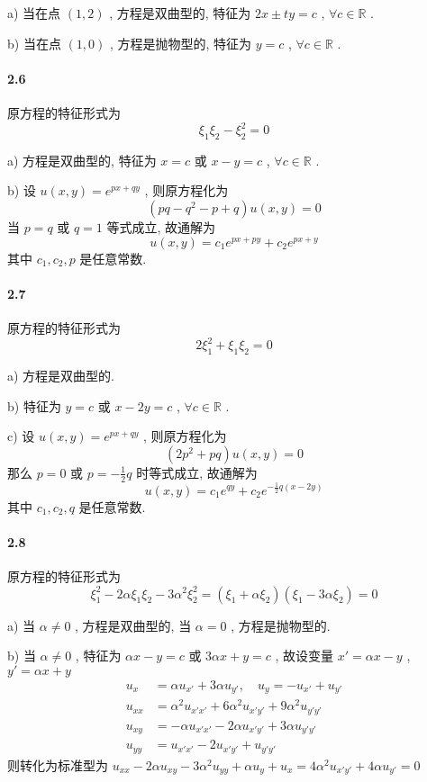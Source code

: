 \documentclass[a4paper, UTF8]{ctexart}				%
\begin{document}
        a) 当在点 $(1,2)$ , 方程是双曲型的, 特征为 $2x \pm ty = c$ , $\forall c \in \mathbb{R}$ .

        b) 当在点 $(1,0)$ , 方程是抛物型的, 特征为 $y = c$ , $\forall c \in \mathbb{R}$ .
    \paragraph{2.6}\quad 
        原方程的特征形式为 
        \[
            \xi_1\xi_2 - \xi_2^2 = 0
        \]

        a) 方程是双曲型的, 特征为 $x = c$ 或 $x - y = c$ , $\forall c \in \mathbb{R}$ .

        b) 设 $u(x,y) = e^{px+qy}$ , 则原方程化为 
        \[
            (pq-q^2-p+q)u(x,y) = 0
        \]
        当 $p=q$ 或 $q=1$ 等式成立, 故通解为 
        \[
            u(x,y) = c_1 e^{px+py} + c_2 e^{px+y}
        \]
        其中 $c_1, c_2, p$ 是任意常数.
    \paragraph{2.7}\quad 
        原方程的特征形式为 
        \[
            2\xi_1^2 + \xi_1\xi_2 = 0
        \]

        a) 方程是双曲型的.

        b) 特征为 $y = c$ 或 $x - 2y = c$ , $\forall c \in \mathbb{R}$ .

        c) 设 $u(x,y) = e^{px+qy}$ , 则原方程化为 
        \[
            (2p^2+pq)u(x,y)=0
        \]
        那么 $p=0$ 或 $p=-\frac{1}{2}q$ 时等式成立, 故通解为
        $$
            u(x,y) = c_1 e^{qy} + c_2 e^{-\frac{1}{2}q(x-2y)}
        $$
        其中 $c_1, c_2, q$ 是任意常数.
    \paragraph{2.8}\quad 
        原方程的特征形式为 
        \[
            \xi_1^2 -2 \alpha \xi_1\xi_2 -3 \alpha^2 \xi_2^2 = (\xi_1 + \alpha \xi_2)(\xi_1 - 3 \alpha \xi_2) = 0
        \]

        a) 当 $\alpha \neq 0$ , 方程是双曲型的, 当 $\alpha = 0$ , 方程是抛物型的.

        b) 当 $\alpha \neq 0$ , 特征为 $\alpha x - y = c$ 或 $3\alpha x + y = c$ , 故设变量 $x' = \alpha x - y$ , $y' = \alpha x + y$ 
        \[
            \begin{split}
                u_{x} & = \alpha u_{x'} + 3\alpha u_{y'}, \quad
                u_{y} = -u_{x'} + u_{y'}\\
                u_{xx} & = \alpha^2 u_{x'x'} + 6 \alpha^2 u_{x'y'} + 9\alpha^2 u_{y'y'}\\
                u_{xy} & = -\alpha u_{x'x'} -2\alpha u_{x'y'} + 3\alpha u_{y'y'}\\
                u_{yy} & = u_{x'x'} -2 u_{x'y'} + u_{y'y'}
            \end{split}
        \]
        则转化为标准型为 $u_{xx} -2 \alpha u_{xy} - 3 \alpha^2 u_{yy} + \alpha u_y + u_x = 4\alpha^2 u_{x'y'} + 4 \alpha u_{y'} = 0$
\end{document}
